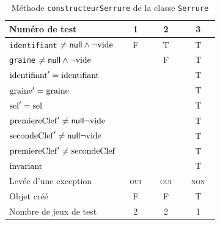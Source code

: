 \documentclass[11pt,article]{article}
\newcommand{\nullvalue}{\textsf{null}\xspace}
\newcommand{\emptyvalue}{\ensuremath\mathrm{vide}}
\newcommand{\invariant}{\ensuremath\mathrm{invariant}}
\begin{document}
\newcommand{\identifiant}{\ensuremath\mathrm{identifiant}}
\newcommand{\graine}{\ensuremath\mathrm{graine}}
\newcommand{\sel}{\ensuremath\mathrm{sel}}
\newcommand{\premiereClef}{\ensuremath\mathrm{premiereClef}}
\newcommand{\secondeClef}{\ensuremath\mathrm{secondeClef}}
\begin{table}[!ht]
\begin{center}
\begin{tabular}{|p{0.4\linewidth}|c|c|c|}
\hline
Numéro de test
&1&2&3\\
\hline
\hline
\texttt{identifiant} $\neq \nullvalue \land \neg \emptyvalue$
&F&T&T\\
\hline
\texttt{graine} $\neq \nullvalue \land \neg \emptyvalue$
& &F&T\\
\hline
\hline
$\identifiant' = \identifiant$
& & &T\\
\hline
$\graine' = \graine$
& & &T\\
\hline
$\sel' = \sel$
& & &T\\
\hline
$\premiereClef' \neq \nullvalue \neg \emptyvalue$
& & &T\\
\hline
$\secondeClef' \neq \nullvalue \neg \emptyvalue$
& & &T\\
\hline
$\premiereClef' \neq \secondeClef$
& & &T\\
\hline
$\invariant$
& & &T\\
\hline
Levée d'une exception&\textsc{oui}&\textsc{oui}&\textsc{non}\\
\hline
\hline
Objet créé
&F&F&T\\
\hline
\hline
Nombre de jeux de test 
&2&2&1\\
\hline
\end{tabular}
\caption{Méthode \texttt{constructeurSerrure} de la
classe \texttt{Serrure}}
\end{center}
\end{table}
\end{document}

